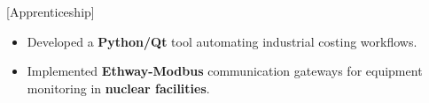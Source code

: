 [Apprenticeship]
\begin{itemize}
\item Developed a \textbf{Python/Qt} tool automating industrial costing workflows.
\item Implemented \textbf{Ethway-Modbus} communication gateways for equipment monitoring in \textbf{nuclear facilities}.
\end{itemize}

{\LaTeXraggedright
{}
\par}
